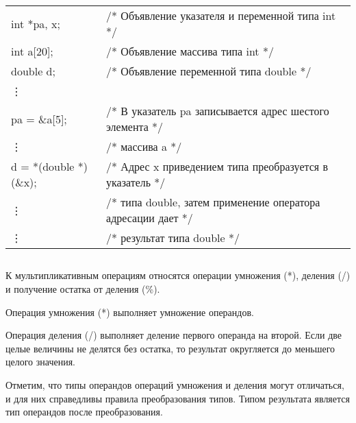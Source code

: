 \begin{pExample}
\begin{tabular}{ l l }
int *pa, x; & \textcolor{exComm}{/* Объявление указателя и переменной типа int */} \\
int a[20]; & \textcolor{exComm}{/* Объявление массива типа int */} \\
double d; & \textcolor{exComm}{/* Объявление переменной типа double */} \\
\vdots  & \textcolor{exComm}{ } \\
pa = \&a[5];  & \textcolor{exComm}{/* В указатель pa записывается адрес шестого элемента */} \\
\vdots  & \textcolor{exComm}{/* массива a */} \\
d = *(double *)(\&x); & \textcolor{exComm}{/* Адрес x приведением типа преобразуется в указатель */} \\
\vdots & \textcolor{exComm}{/* типа double, затем применение оператора адресации дает  */} \\
\vdots  & \textcolor{exComm}{/* результат типа double */} \\
\end{tabular}
\end{pExample}

\subsection{}

К мультипликативным операциям относятся операции умножения (*), деления (/) и получение остатка от деления (\%). \killoverfullbefore

Операция умножения (*) выполняет умножение операндов. \killoverfullbefore

Операция деления (/) выполняет деление первого операнда на второй. Если две целые величины не делятся без остатка, то результат округляется до меньшего целого значения. \killoverfullbefore

Отметим, что типы операндов операций умножения и деления могут отличаться, и для них справедливы правила преобразования типов. Типом результата является тип операндов после преобразования. \killoverfullbefore 

